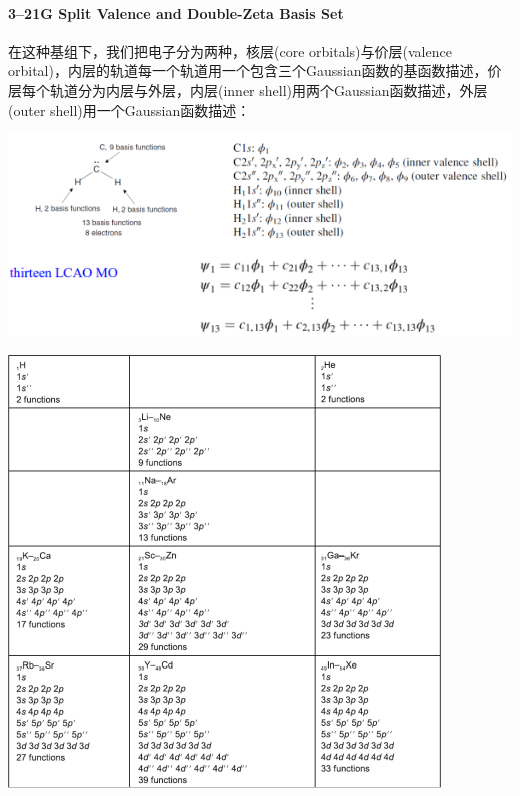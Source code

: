 \paragraph*{3–21G Split Valence and Double-Zeta Basis Set}
在这种基组下，我们把电子分为两种，核层(core orbitals)与价层(valence orbital)，内层的轨道每一个轨道用一个包含三个Gaussian函数的基函数描述，价层每个轨道分为内层与外层，内层(inner shell)用两个Gaussian函数描述，外层(outer shell)用一个Gaussian函数描述：
\begin{center}
    \includegraphics[scale=0.9]{fig/lzhx/微信图片_20211102172815}
\end{center}
\begin{center}
    \includegraphics[scale=0.7]{fig/lzhx/微信图片_202111021728151}
\end{center}

